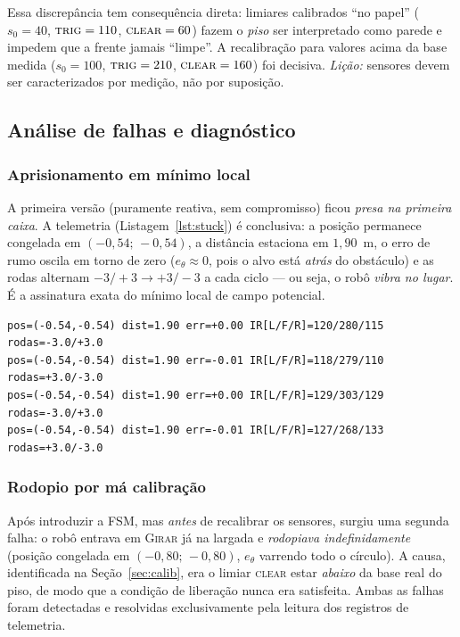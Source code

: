 \documentclass[11pt,a4paper]{article}
\begin{document}
\noindent Essa discrepância tem consequência direta: limiares calibrados ``no papel'' ($s_0=40$, $\textsc{trig}=110$, $\textsc{clear}=60$) fazem o \emph{piso} ser interpretado como parede e impedem que a frente jamais ``limpe''. A recalibração para valores acima da base medida ($s_0=100$, $\textsc{trig}=210$, $\textsc{clear}=160$) foi decisiva. \emph{Lição:} sensores devem ser caracterizados por medição, não por suposição.

\subsection{Análise de falhas e diagnóstico}
\subsubsection{Aprisionamento em mínimo local}
A primeira versão (puramente reativa, sem compromisso) ficou \emph{presa na primeira caixa}. A telemetria (Listagem~\ref{lst:stuck}) é conclusiva: a posição permanece congelada em $(-0{,}54;\,-0{,}54)$, a distância estaciona em $1{,}90$~m, o erro de rumo oscila em torno de zero ($e_\theta\approx 0$, pois o alvo está \emph{atrás} do obstáculo) e as rodas alternam $-3/+3 \to +3/-3$ a cada ciclo --- ou seja, o robô \emph{vibra no lugar}. É a assinatura exata do mínimo local de campo potencial.

\begin{lstlisting}[style=log,caption={Telemetria do aprisionamento em mínimo local (excerto real).},label={lst:stuck}]
pos=(-0.54,-0.54) dist=1.90 err=+0.00 IR[L/F/R]=120/280/115 rodas=-3.0/+3.0
pos=(-0.54,-0.54) dist=1.90 err=-0.01 IR[L/F/R]=118/279/110 rodas=+3.0/-3.0
pos=(-0.54,-0.54) dist=1.90 err=+0.00 IR[L/F/R]=129/303/129 rodas=-3.0/+3.0
pos=(-0.54,-0.54) dist=1.90 err=-0.01 IR[L/F/R]=127/268/133 rodas=+3.0/-3.0
\end{lstlisting}

\subsubsection{Rodopio por má calibração}
Após introduzir a FSM, mas \emph{antes} de recalibrar os sensores, surgiu uma segunda falha: o robô entrava em \textsc{Girar} já na largada e \emph{rodopiava indefinidamente} (posição congelada em $(-0{,}80;\,-0{,}80)$, $e_\theta$ varrendo todo o círculo). A causa, identificada na Seção~\ref{sec:calib}, era o limiar \textsc{clear} estar \emph{abaixo} da base real do piso, de modo que a condição de liberação nunca era satisfeita. Ambas as falhas foram detectadas e resolvidas exclusivamente pela leitura dos registros de telemetria.
\end{document}
